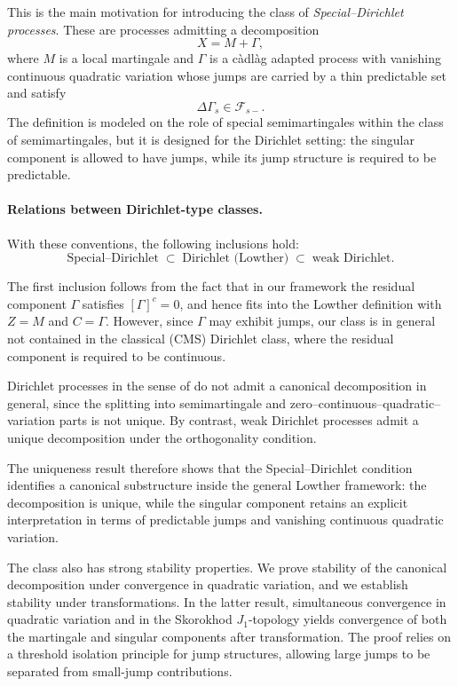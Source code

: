 \documentclass[a4paper,10pt]{article}
\begin{document}
This is the main motivation for introducing the class of
\emph{Special--Dirichlet processes}. These are processes admitting a
decomposition
\[
X=M+\Gamma,
\]
where \(M\) is a local martingale and \(\Gamma\) is a c\`adl\`ag adapted
process with vanishing continuous quadratic variation whose jumps are
carried by a thin predictable set and satisfy
\[
        \Delta\Gamma_s\in\mathcal F_{s-}.
\]
The definition is modeled on the role of special semimartingales within
the class of semimartingales, but it is designed for the Dirichlet
setting: the singular component is allowed to have jumps, while its jump
structure is required to be predictable.

\medskip
\paragraph{Relations between Dirichlet-type classes.}
With these conventions, the following inclusions hold:
\[
\boxed{
\text{Special--Dirichlet}
\;\subset\;
\text{Dirichlet (Lowther)}
\;\subset\;
\text{weak Dirichlet}.
}
\]

The first inclusion follows from the fact that in our framework the
residual component \(\Gamma\) satisfies \([\Gamma]^c=0\), and hence
fits into the Lowther definition with \(Z=M\) and \(C=\Gamma\).
However, since \(\Gamma\) may exhibit jumps, our class is in general
not contained in the classical (CMS) Dirichlet class, where the
residual component is required to be continuous.


\medskip

Dirichlet processes in the sense of \cite{Low} do not admit a canonical
decomposition in general, since the splitting into semimartingale and
zero--continuous--quadratic--variation parts is not unique. By contrast,
weak Dirichlet processes admit a unique decomposition under the
orthogonality condition.



The uniqueness result therefore shows that the Special--Dirichlet
condition identifies a canonical substructure inside the general
Lowther framework: the decomposition is unique, while the singular
component retains an explicit interpretation in terms of predictable
jumps and vanishing continuous quadratic variation.

The class also has strong stability properties. We prove stability of the
canonical decomposition under convergence in quadratic variation, and we
establish stability under transformations. In the latter result,
simultaneous convergence in quadratic variation and in the Skorokhod
\(J_1\)-topology yields convergence of both the martingale and singular
components after transformation. The proof relies on a threshold
isolation principle for jump structures, allowing large jumps to be
separated from small-jump contributions.
\end{document}
